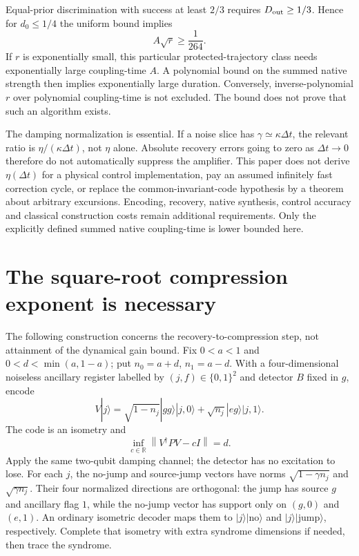 \documentclass[11pt]{article}
\newcommand{\norm}[1]{\left\lVert#1\right\rVert}
\newcommand{\ket}[1]{|#1\rangle}
\begin{document}
Equal-prior discrimination with success at least $2/3$ requires $D_{\rm out}\geq1/3$. Hence for $d_0\leq1/4$ the uniform bound implies
\begin{equation}
 A\sqrt r\geq\frac1{264}.\label{eq:cost}
\end{equation}
If $r$ is exponentially small, this particular protected-trajectory class needs exponentially large coupling-time $A$. A polynomial bound on the summed native strength then implies exponentially large duration. Conversely, inverse-polynomial $r$ over polynomial coupling-time is not excluded. The bound does not prove that such an algorithm exists.

The damping normalization is essential. If a noise slice has $\gamma\simeq\kappa\Delta t$, the relevant ratio is $\eta/(\kappa\Delta t)$, not $\eta$ alone. Absolute recovery errors going to zero as $\Delta t\to0$ therefore do not automatically suppress the amplifier. This paper does not derive $\eta(\Delta t)$ for a physical control implementation, pay an assumed infinitely fast correction cycle, or replace the common-invariant-code hypothesis by a theorem about arbitrary excursions. Encoding, recovery, native synthesis, control accuracy and classical construction costs remain additional requirements. Only the explicitly defined summed native coupling-time is lower bounded here.

\section{The square-root compression exponent is necessary}
The following construction concerns the recovery-to-compression step, not attainment of the dynamical gain bound. Fix $0<a<1$ and $0<d<\min(a,1-a)$; put $n_0=a+d$, $n_1=a-d$. With a four-dimensional noiseless ancillary register labelled by $(j,f)\in\{0,1\}^2$ and detector $B$ fixed in $g$, encode
\begin{equation}
 V\ket j=\sqrt{1-n_j}\ket{gg}\ket{j,0}
             +\sqrt{n_j}\ket{eg}\ket{j,1}.\label{eq:code}
\end{equation}
The code is an isometry and
\begin{equation}
 \inf_{c\in\mathbb R}\norm{V^\dagger PV-cI}=d.\label{eq:defect}
\end{equation}
Apply the same two-qubit damping channel; the detector has no excitation to lose. For each $j$, the no-jump and source-jump vectors have norms $\sqrt{1-\gamma n_j}$ and $\sqrt{\gamma n_j}$. Their four normalized directions are orthogonal: the jump has source $g$ and ancillary flag $1$, while the no-jump vector has support only on $(g,0)$ and $(e,1)$. An ordinary isometric decoder maps them to $\ket j\ket{\mathrm{no}}$ and $\ket j\ket{\mathrm{jump}}$, respectively. Complete that isometry with extra syndrome dimensions if needed, then trace the syndrome.
\end{document}
